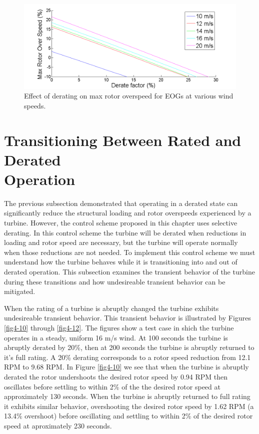 \begin{figure}[htbp]
	\centering
		\includegraphics[trim = {1cm 0 2cm 0}, clip, width = \linewidth]{Figures/ch4Figures/fig4-9.png}
		
	\caption{Effect of derating on max rotor overspeed for EOGs at various wind speeds.}
	\label{fig4-9}
\end{figure}



\section{Transitioning Between Rated and Derated \\
		Operation} \label{section4-4}


The previous subsection demonstrated that operating in a derated state can significantly reduce the structural loading and rotor overspeeds experienced by a turbine. However, the control scheme proposed in this chapter uses selective derating. In this control scheme the turbine will be derated when reductions in loading and rotor speed are necessary, but the turbine will operate normally when those reductions are not needed. To implement this control scheme we must understand how the turbine behaves while it is transitioning into and out of derated operation. This subsection examines the transient behavior of the turbine during these transitions and how undesireable transient behavior can be mitigated.

 When the rating of a turbine is abruptly changed the turbine exhibits undesireable transient behavior. This transient behavior is illustrated by Figures \ref{fig4-10} through \ref{fig4-12}. The figures show a test case in shich the turbine operates in a steady, uniform 16 m/s wind. At 100 seconds the turbine is abruptly derated by 20\%, then at 200 seconds the turbine is abruptly returned to it's full rating. A 20\% derating corresponds to a rotor speed reduction from 12.1 RPM to 9.68 RPM. In Figure \ref{fig4-10} we see that when the turbine is abruptly derated the rotor undershoots the desired rotor speed by 0.94 RPM then oscillates before settling to within 2\% of the the desired rotor speed at approximately 130 seconds. When the turbine is abruptly returned to full rating it exhibits similar behavior, overshooting the desired rotor speed by 1.62 RPM (a 13.4\% overshoot) before oscillating and settling to within 2\% of the desired rotor speed at aproximately 230 seconds. 


